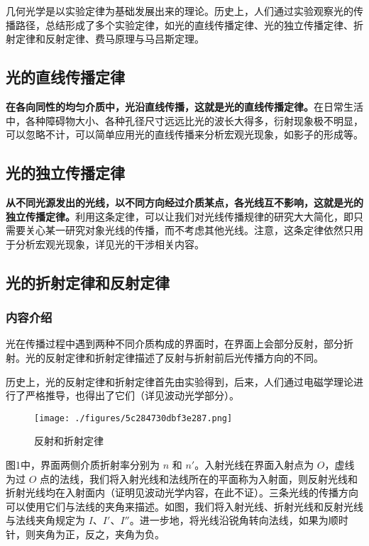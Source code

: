 

几何光学是以实验定律为基础发展出来的理论。历史上，人们通过实验观察光的传播路径，总结形成了多个实验定律，如光的直线传播定律、光的独立传播定律、折射定律和反射定律、费马原理与马吕斯定理。

\subsection{光的直线传播定律}

\textbf{在各向同性的均匀介质中，光沿直线传播，这就是光的直线传播定律。}在日常生活中，各种障碍物大小、各种孔径尺寸远远比光的波长大得多，衍射现象极不明显，可以忽略不计，可以简单应用光的直线传播来分析宏观光现象，如影子的形成等。

\subsection{光的独立传播定律}

\textbf{从不同光源发出的光线，以不同方向经过介质某点，各光线互不影响，这就是光的独立传播定律。}利用这条定律，可以让我们对光线传播规律的研究大大简化，即只需要关心某一研究对象光线的传播，而不考虑其他光线。注意，这条定律依然只用于分析宏观光现象，详见光的干涉相关内容。

\subsection{光的折射定律和反射定律}

\subsubsection{内容介绍}

光在传播过程中遇到两种不同介质构成的界面时，在界面上会部分反射，部分折射。光的反射定律和折射定律描述了反射与折射前后光传播方向的不同。

历史上，光的反射定律和折射定律首先由实验得到，后来，人们通过电磁学理论进行了严格推导，也得出了它们（详见波动光学部分）。

\begin{figure}[ht]
\centering
\texttt{[image: ./figures/5c284730dbf3e287.png]}
\caption{反射和折射定律} \label{fig_GeOp2_1}
\end{figure}

图1中，界面两侧介质折射率分别为 $n$ 和 $n'$。入射光线在界面入射点为 $O$，虚线为过 $O$ 点的法线，我们将入射光线和法线所在的平面称为入射面，则反射光线和折射光线均在入射面内（证明见波动光学内容，在此不证）。三条光线的传播方向可以使用它们与法线的夹角来描述。如图，我们将入射光线、折射光线和反射光线与法线夹角规定为 $I$、$I'$、$I''$。进一步地，将光线沿锐角转向法线，如果为顺时针，则夹角为正，反之，夹角为负。

